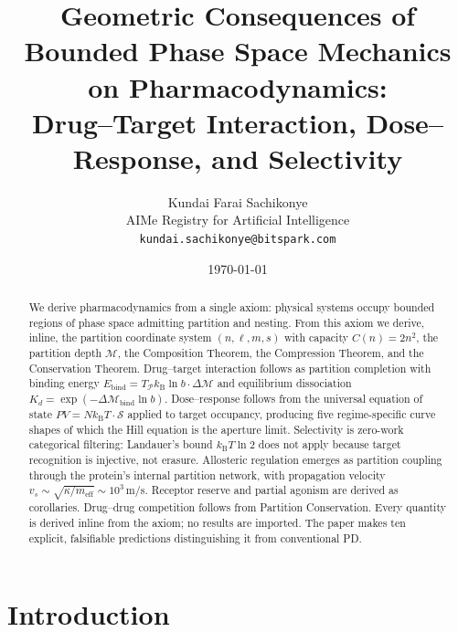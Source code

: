 \documentclass[twocolumn,10pt,a4paper]{article}
\theoremstyle{definition}
\theoremstyle{remark}
\newcommand{\kB}{k_{\mathrm{B}}}
\newcommand{\Depth}{\mathcal{M}}
\newcommand{\Partition}{\mathcal{P}}
\begin{document}
\title{\textbf{Geometric Consequences of Bounded Phase Space Mechanics on Pharmacodynamics:\\
Drug--Target Interaction, Dose--Response, and Selectivity}}

\author{
Kundai Farai Sachikonye\\
AIMe Registry for Artificial Intelligence\\
\texttt{kundai.sachikonye@bitspark.com}
}


\date{\today}
\maketitle

\begin{abstract}
\noindent We derive pharmacodynamics from a single axiom: physical systems occupy bounded regions of phase space admitting partition and nesting. From this axiom we derive, inline, the partition coordinate system $(n,\ell,m,s)$ with capacity $C(n)=2n^2$, the partition depth $\Depth$, the Composition Theorem, the Compression Theorem, and the Conservation Theorem. Drug--target interaction follows as partition completion with binding energy $E_{\mathrm{bind}} = T_\Partition \kB \ln b \cdot \Delta\Depth$ and equilibrium dissociation $K_d = \exp(-\Delta\Depth_{\mathrm{bind}}\ln b)$. Dose--response follows from the universal equation of state $PV = N\kB T\cdot\mathcal{S}$ applied to target occupancy, producing five regime-specific curve shapes of which the Hill equation is the aperture limit. Selectivity is zero-work categorical filtering: Landauer's bound $\kB T\ln 2$ does not apply because target recognition is injective, not erasure. Allosteric regulation emerges as partition coupling through the protein's internal partition network, with propagation velocity $v_s \sim \sqrt{\kappa/m_{\mathrm{eff}}} \sim 10^3$\,m/s. Receptor reserve and partial agonism are derived as corollaries. Drug--drug competition follows from Partition Conservation. Every quantity is derived inline from the axiom; no results are imported. The paper makes ten explicit, falsifiable predictions distinguishing it from conventional PD.
\end{abstract}

\section{Introduction}
\end{document}
